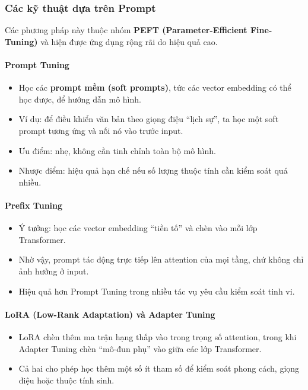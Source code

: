 \subsubsection{Các kỹ thuật dựa trên Prompt}
\label{sssec:prompt_based_controlled_generation}

Các phương pháp này thuộc nhóm \textbf{PEFT (Parameter-Efficient Fine-Tuning)} và hiện được ứng dụng rộng rãi do hiệu quả cao.

\paragraph{Prompt Tuning}
\begin{itemize}
    \item Học các \textbf{prompt mềm (soft prompts)}, tức các vector embedding có thể học được, để hướng dẫn mô hình.
    \item Ví dụ: để điều khiển văn bản theo giọng điệu “lịch sự”, ta học một soft prompt tương ứng và nối nó vào trước input.
    \item Ưu điểm: nhẹ, không cần tinh chỉnh toàn bộ mô hình.
    \item Nhược điểm: hiệu quả hạn chế nếu số lượng thuộc tính cần kiểm soát quá nhiều.
\end{itemize}

\paragraph{Prefix Tuning}
\begin{itemize}
    \item Ý tưởng: học các vector embedding “tiền tố” và chèn vào mỗi lớp Transformer.
    \item Nhờ vậy, prompt tác động trực tiếp lên attention của mọi tầng, chứ không chỉ ảnh hưởng ở input.
    \item Hiệu quả hơn Prompt Tuning trong nhiều tác vụ yêu cầu kiểm soát tinh vi.
\end{itemize}

\paragraph{LoRA (Low-Rank Adaptation) và Adapter Tuning}
\begin{itemize}
    \item LoRA chèn thêm ma trận hạng thấp vào trong trọng số attention, trong khi Adapter Tuning chèn “mô-đun phụ” vào giữa các lớp Transformer.
    \item Cả hai cho phép học thêm một số ít tham số để kiểm soát phong cách, giọng điệu hoặc thuộc tính sinh.
\end{itemize}

